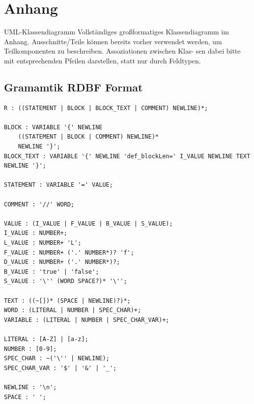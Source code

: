 \documentclass[parskip=full]{scrartcl}
\begin{document}
\section{Anhang}
UML-Klassendiagramm 
Vollständiges großformatiges Klassendiagramm im Anhang. Ausschnitte/Teile können bereits
vorher verwendet werden, um Teilkomponenten zu beschreiben. Assoziationen zwischen Klas-
sen dabei bitte mit entsprechenden Pfeilen darstellen, statt nur durch Feldtypen.


\subsection{Gramamtik RDBF Format}
\begin{verbatim}
R : ((STATEMENT | BLOCK | BLOCK_TEXT | COMMENT) NEWLINE)*;

BLOCK : VARIABLE '{' NEWLINE
	((STATEMENT | BLOCK | COMMENT) NEWLINE)*
	NEWLINE '}';
BLOCK_TEXT : VARIABLE '{' NEWLINE 'def_blockLen=' I_VALUE NEWLINE TEXT NEWLINE '}';
	
STATEMENT : VARIABLE '=' VALUE;

COMMENT : '//' WORD;

VALUE : (I_VALUE | F_VALUE | B_VALUE | S_VALUE);
I_VALUE : NUMBER+;
L_VALUE : NUMBER+ 'L';
F_VALUE : NUMBER+ ('.' NUMBER*)? 'f';
D_VALUE : NUMBER+ ('.' NUMBER*)?;
B_VALUE : 'true' | 'false';
S_VALUE : '\'' (WORD SPACE?)* '\'';

TEXT : ((~[])* (SPACE | NEWLINE)?)*;
WORD : (LITERAL | NUMBER | SPEC_CHAR)+;
VARIABLE : (LITERAL | NUMBER | SPEC_CHAR_VAR)+;

LITERAL : [A-Z] | [a-z];
NUMBER : [0-9];
SPEC_CHAR : ~('\'' | NEWLINE);
SPEC_CHAR_VAR : '$' | '&' | '_';

NEWLINE : '\n';
SPACE : ' ';
\end{verbatim}
\end{document}
